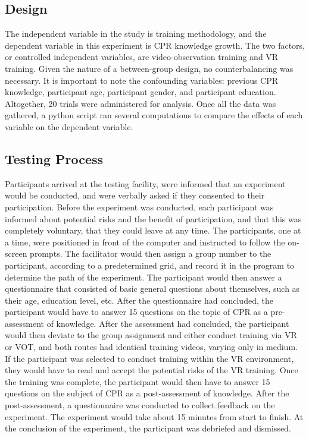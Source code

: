 \documentclass[manuscript]{./Models/acmart}
\begin{document}
\subsection{Design}
The independent variable in the study is training methodology, and the dependent variable in this experiment is CPR knowledge growth. The two factors, or controlled independent variables, are video-observation training and VR training. Given the nature of a between-group design, no counterbalancing was necessary. It is important to note the confounding variables: previous CPR knowledge, participant age, participant gender, and participant education. Altogether, 20 trials were administered for analysis. Once all the data was gathered, a python script ran several computations to compare the effects of each variable on the dependent variable.

\subsection{Testing Process}
Participants arrived at the testing facility, were informed that an experiment would be conducted, and were verbally asked if they consented to their participation. Before the experiment was conducted, each participant was informed about potential risks and the benefit of participation, and that this was completely voluntary, that they could leave at any time. The participants, one at a time, were positioned in front of the computer and instructed to follow the on-screen prompts. The facilitator would then assign a group number to the participant, according to a predetermined grid, and record it in the program to determine the path of the experiment. The participant would then answer a questionnaire that consisted of basic general questions about themselves, such as their age, education level, etc. After the questionnaire had concluded, the participant would have to answer 15 questions on the topic of CPR as a pre-assessment of knowledge. After the assessment had concluded, the participant would then deviate to the group assignment and either conduct training via VR or VOT, and both routes had identical training videos, varying only in medium. If the participant was selected to conduct training within the VR environment, they would have to read and accept the potential risks of the VR training. Once the training was complete, the participant would then have to answer 15 questions on the subject of CPR as a post-assessment of knowledge. After the post-assessment, a questionnaire was conducted to collect feedback on the experiment. The experiment would take about 15 minutes from start to finish. At the conclusion of the experiment, the participant was debriefed and dismissed.
\end{document}
